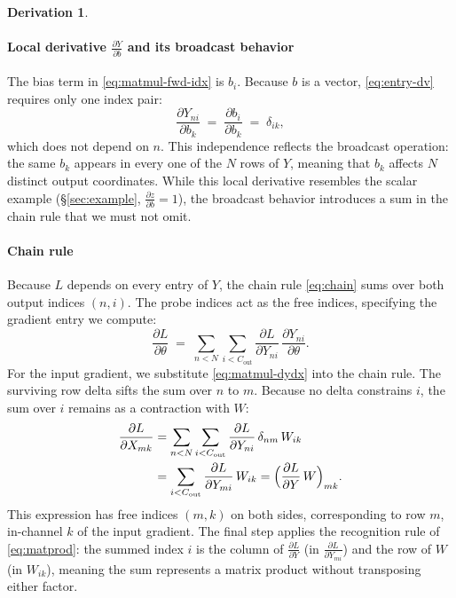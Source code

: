 \documentclass[letterpaper, 10 pt, conference]{ieeeconf}
\newcommand{\pdv}[2]{\frac{\partial #1}{\partial #2}}
\newcommand{\dL}[1]{\pdv{L}{#1}}
\newcommand{\kron}[2]{\delta_{#1 #2}}
\theoremstyle{definition}
\newtheorem*{derivation}{Derivation}
\begin{document}
\begin{derivation}
  \paragraph{Local derivative $\pdv{Y}{b}$ and its broadcast behavior}
  The bias term in \eqref{eq:matmul-fwd-idx} is $b_i$. Because $b$ is a vector, \eqref{eq:entry-dv} requires only one index pair:
  \begin{equation}
    \pdv{Y_{ni}}{b_k} \;=\; \pdv{b_i}{b_k} \;=\; \kron{i}{k},
    \label{eq:matmul-dydb}
  \end{equation}
  which does not depend on $n$. This independence reflects the broadcast operation: the same $b_k$ appears in every one of the $N$ rows of $Y$, meaning that $b_k$ affects $N$ distinct output coordinates. While this local derivative resembles the scalar example (\S\ref{sec:example}, $\pdv{z}{b} = 1$), the broadcast behavior introduces a sum in the chain rule that we must not omit.

  \paragraph{Chain rule}
  Because $L$ depends on every entry of $Y$, the chain rule \eqref{eq:chain} sums over both output indices $(n, i)$. The probe indices act as the free indices, specifying the gradient entry we compute:
  \begin{equation}
    \dL{\theta}
    \;=\;
    \sum_{n<N} \sum_{i<C_{\text{out}}}
    \dL{Y_{ni}}\,\pdv{Y_{ni}}{\theta}.
    \label{eq:matmul-chain}
  \end{equation}
  For the input gradient, we substitute \eqref{eq:matmul-dydx} into the chain rule. The surviving row delta sifts the sum over $n$ to $m$. Because no delta constrains $i$, the sum over $i$ remains as a contraction with $W$:
  \begin{align}
    \dL{X_{mk}}
     & = \sum_{n<N} \sum_{i<C_{\text{out}}}
    \dL{Y_{ni}}\,\kron{n}{m}\,W_{ik} \notag          \\
     & = \sum_{i<C_{\text{out}}} \dL{Y_{mi}}\,W_{ik}
    = \Bigl(\dL{Y}\,W\Bigr)_{mk}.
    \label{eq:matmul-dx-idx}
  \end{align}
  This expression has free indices $(m, k)$ on both sides, corresponding to row $m$, in-channel $k$ of the input gradient. The final step applies the recognition rule of \eqref{eq:matprod}: the summed index $i$ is the column of $\dL{Y}$ (in $\dL{Y_{mi}}$) and the row of $W$ (in $W_{ik}$), meaning the sum represents a matrix product without transposing either factor.


\end{derivation}
\end{document}
